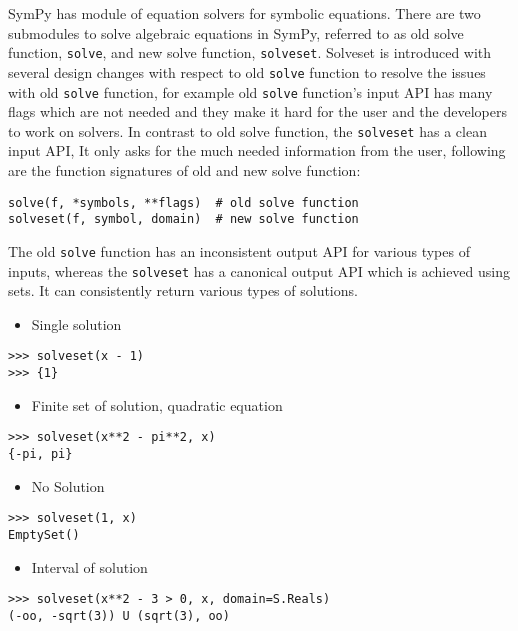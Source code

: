 

SymPy has module of equation solvers for symbolic equations. There are two
submodules to solve algebraic equations in SymPy, referred to as old solve
function, \texttt{solve}, and new solve function, \texttt{solveset}.
Solveset is introduced with several design changes with respect to old
\texttt{solve} function to resolve the issues with old \texttt{solve} function,
for example old \texttt{solve} function's input API has many flags which are
not needed and they make it hard for the user and the developers to work on
solvers. In contrast to old solve function, the \texttt{solveset} has a clean
input API, It only asks for the much needed information from the user, following
are the function signatures of old and new solve function:

\begin{verbatim}
solve(f, *symbols, **flags)  # old solve function
solveset(f, symbol, domain)  # new solve function
\end{verbatim}

The old \texttt{solve} function has an inconsistent output API for various types
of inputs, whereas the \texttt{solveset} has a canonical output API which is
achieved using sets. It can consistently return various types of solutions.

\begin{itemize}
\item Single solution
\end{itemize}
\begin{verbatim}
>>> solveset(x - 1)
>>> {1}
\end{verbatim}

\begin{itemize}
\item Finite set of solution, quadratic equation
\end{itemize}
\begin{verbatim}
>>> solveset(x**2 - pi**2, x)
{-pi, pi}
\end{verbatim}

\begin{itemize}
\item No Solution
\end{itemize}
\begin{verbatim}
>>> solveset(1, x)
EmptySet()
\end{verbatim}

\begin{itemize}
\item Interval of solution
\end{itemize}
\begin{verbatim}
>>> solveset(x**2 - 3 > 0, x, domain=S.Reals)
(-oo, -sqrt(3)) U (sqrt(3), oo)
\end{verbatim}

